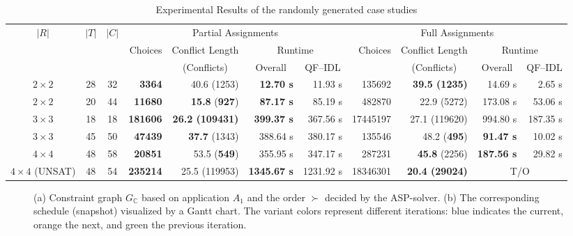 \begin{table*}[t]
	\centering
	\caption{Experimental Results of the randomly generated case studies}
	\vspace*{-3mm}
	\label{tab:results}
	\begin{tabular}{@{}ccc|rrrr|rrrr@{}}
		\toprule
		\multirow{3}{*}{$\lvert R\rvert$} & \multirow{3}{*}{$\lvert T\rvert$} & \multirow{3}{*}{$\lvert C\rvert$} & \multicolumn{4}{c|}{Partial Assignments} & \multicolumn{4}{c}{Full Assignments}  \\ \cmidrule(l){4-11} 
		&         &    & Choices   & Conflict Length & \multicolumn{2}{c|}{Runtime}  & Choices   & Conflict Length & \multicolumn{2}{c}{Runtime} \\ 
		&         &    &           &    \multicolumn{1}{c}{(Conflicts)}  &    \multicolumn{1}{c}{Overall}    &  \multicolumn{1}{c|}{QF--IDL}  &  &   \multicolumn{1}{c}{(Conflicts)} &\multicolumn{1}{c}{Overall} &  \multicolumn{1}{c}{QF--IDL}       \\ \midrule
		$2\times2$& 28 & 32 & \textbf{3364} & 40.6 (1253) & \textbf{12.70 s} & 11.93 s  & 135692    & \textbf{39.5 (1235)}  &   14.69 s & 2.65 s \\ %
		$2\times2$& 20 & 44 & \textbf{11680} & \textbf{15.8} (\textbf{927})                   & \textbf{87.17 s} & 85.19 s              & 482870     & {22.9} (5272)                  &  173.08 s & 53.06 s  \\ %
		$3\times3$& 18 & 18 & \textbf{181606} & \textbf{26.2 (109431)}             & \textbf{399.37 s} & 367.56 s           & 17445197  & 27.1 (119620)               &   994.80 s & 187.35 s    \\ %
		$3\times3$& 45 & 50 & \textbf{47439}  &\textbf{37.7} (1343)                & 388.64 s & 380.17 s                  & 135546    & 48.2 (\textbf{495})                    & \textbf{91.47 s}  &   10.02 s      \\ %
		$4\times4$& 48 & 58 & \textbf{20851}&  53.5 (\textbf{549})                  &  355.95 s & 347.17 s            &  287231    &  \textbf{45.8} (2256)                 &  \textbf{187.56 s} & 29.82 s \\ %
		$4\times4$ (UNSAT) & 48 & 54 & \textbf{235214} & 25.5 (119953)    &   \textbf{1345.67 s} & 1231.92 s       & 18346301 & \textbf{20.4 (29024)}              & \multicolumn{2}{c}{T/O} \\ \bottomrule %
	\end{tabular}
	\vspace*{-4mm}
\end{table*}
\begin{figure*}[t]
	\centering
	\resizebox{0.8\textwidth}{!}{%
		
	}
	\vspace*{-3mm}
	\caption{(a) Constraint graph $G_\mathbb{C}$ based on application $A_1$ and the order $\succ$ decided by the ASP-solver. (b) The corresponding  schedule (snapshot) visualized by a Gantt chart. The variant colors represent different iterations: blue indicates the current, orange the next, and green the previous iteration.}
	\label{fig:periodicschedule1}
	\vspace*{-6mm}
\end{figure*}
